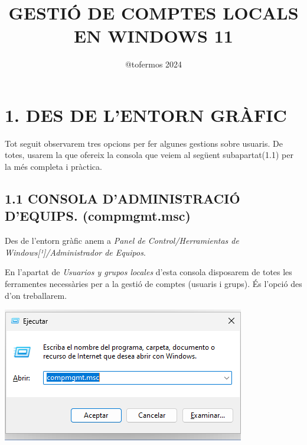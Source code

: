 \documentclass[
  a4paper,
]{article}
\title{GESTIÓ DE COMPTES LOCALS EN WINDOWS 11}
\author{@tofermos 2024}
\date{}
\begin{document}
\maketitle

{
\setcounter{tocdepth}{2}
\tableofcontents
}
\newpage

\renewcommand\tablename{Tabla}

\section{1. DES DE L'ENTORN GRÀFIC}\label{des-de-lentorn-gruxe0fic}

Tot seguit observarem tres opcions per fer algunes gestions sobre
usuaris. De totes, usarem la que ofereix la consola que veiem al següent
subapartat(1.1) per la més completa i pràctica.

\subsection{1.1 CONSOLA D'ADMINISTRACIÓ D'EQUIPS.
(compmgmt.msc)}\label{consola-dadministraciuxf3-dequips.-compmgmt.msc}

Des de l'entorn gràfic anem a \emph{Panel de Control/Herramientas de
Windows{[}¹{]}/Administrador de Equipos}.

En l'apartat de \emph{Usuarios y grupos locales} d'esta consola
disposarem de totes les ferramentes necessàries per a la gestió de
comptes (usuaris i grups). És l'opció des d'on treballarem.

\includegraphics{png/WinRcompmgmt.png}
\end{document}
